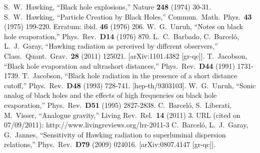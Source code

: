 \documentclass[12pt]{article}
\begin{document}
\newpage
\begin{thebibliography}{666}

%
  S.~W.~Hawking,
  ``Black hole explosions,''
  Nature {\bf 248 } (1974)  30-31.
%
  S.~W.~Hawking,
  ``Particle Creation by Black Holes,''
  Commun.\ Math.\ Phys.\  {\bf 43 } (1975)  199-220. 
Erratum: {ibid.\/}  {\bf 46 } (1976) 206. %
  W.~G.~Unruh,
  ``Notes on black hole evaporation,''
  Phys.\ Rev.\  {\bf D14 } (1976)  870.
  L.~C.~Barbado, C.~Barcel\'o, L.~J.~Garay,
  ``Hawking radiation as perceived by different observers,''
  Class.\ Quant.\ Grav.\  {\bf 28 } (2011)  125021.
  [arXiv:1101.4382 [gr-qc]].
  T.~Jacobson,
  ``Black hole evaporation and ultrashort distances,''
  Phys.\ Rev.\  {\bf D44 } (1991)  1731-1739.
  T.~Jacobson,
  ``Black hole radiation in the presence of a short distance cutoff,''
  Phys.\ Rev.\  {\bf D48 } (1993)  728-741.
  [hep-th/9303103].
  W.~G.~Unruh,
  ``Sonic analog of black holes and the effects of high frequencies on black hole evaporation,''
  Phys.\ Rev.\  {\bf D51 } (1995)  2827-2838.
  C.~Barcel\'o, S.~Liberati, M.~Visser,
  ``Analogue gravity,''
  Living Rev.\ Rel.\  {\bf 14 } (2011)  3.
URL (cited on 07/09/2011):
http://www.livingreviews.org/lrr-2011-3
  C.~Barcel\'o, L.~J.~Garay, G.~Jannes,
  ``Sensitivity of Hawking radiation to superluminal dispersion relations,''
  Phys.\ Rev.\  {\bf D79 } (2009)  024016.
  [arXiv:0807.4147 [gr-qc]].

\end{thebibliography}
\end{document}
